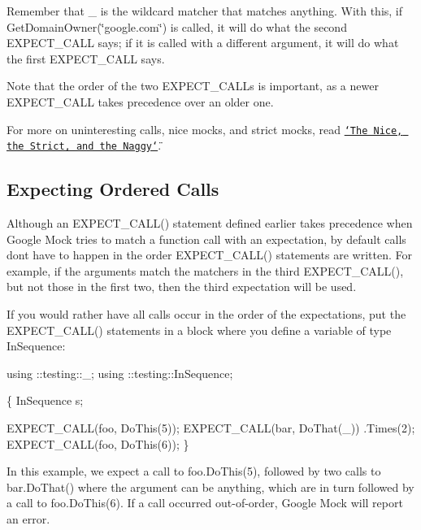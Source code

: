 Remember that {\ttfamily \+\_\+} is the wildcard matcher that matches anything. With this, if {\ttfamily Get\+Domain\+Owner(\char`\"{}google.\+com\char`\"{})} is called, it will do what the second {\ttfamily E\+X\+P\+E\+C\+T\+\_\+\+C\+A\+LL} says; if it is called with a different argument, it will do what the first {\ttfamily E\+X\+P\+E\+C\+T\+\_\+\+C\+A\+LL} says.

Note that the order of the two {\ttfamily E\+X\+P\+E\+C\+T\+\_\+\+C\+A\+L\+Ls} is important, as a newer {\ttfamily E\+X\+P\+E\+C\+T\+\_\+\+C\+A\+LL} takes precedence over an older one.

For more on uninteresting calls, nice mocks, and strict mocks, read \href{#the-nice-the-strict-and-the-naggy}{\tt \char`\"{}\+The Nice, the Strict, and the Naggy\char`\"{}}.

\subsection*{Expecting Ordered Calls}

Although an {\ttfamily E\+X\+P\+E\+C\+T\+\_\+\+C\+A\+L\+L()} statement defined earlier takes precedence when Google Mock tries to match a function call with an expectation, by default calls don\textquotesingle{}t have to happen in the order {\ttfamily E\+X\+P\+E\+C\+T\+\_\+\+C\+A\+L\+L()} statements are written. For example, if the arguments match the matchers in the third {\ttfamily E\+X\+P\+E\+C\+T\+\_\+\+C\+A\+L\+L()}, but not those in the first two, then the third expectation will be used.

If you would rather have all calls occur in the order of the expectations, put the {\ttfamily E\+X\+P\+E\+C\+T\+\_\+\+C\+A\+L\+L()} statements in a block where you define a variable of type {\ttfamily In\+Sequence}\+:


\begin{DoxyCode}
using ::testing::\_;
using ::testing::InSequence;

\{
  InSequence s;

  EXPECT\_CALL(foo, DoThis(5));
  EXPECT\_CALL(bar, DoThat(\_))
      .Times(2);
  EXPECT\_CALL(foo, DoThis(6));
\}
\end{DoxyCode}


In this example, we expect a call to {\ttfamily foo.\+Do\+This(5)}, followed by two calls to {\ttfamily bar.\+Do\+That()} where the argument can be anything, which are in turn followed by a call to {\ttfamily foo.\+Do\+This(6)}. If a call occurred out-\/of-\/order, Google Mock will report an error.

